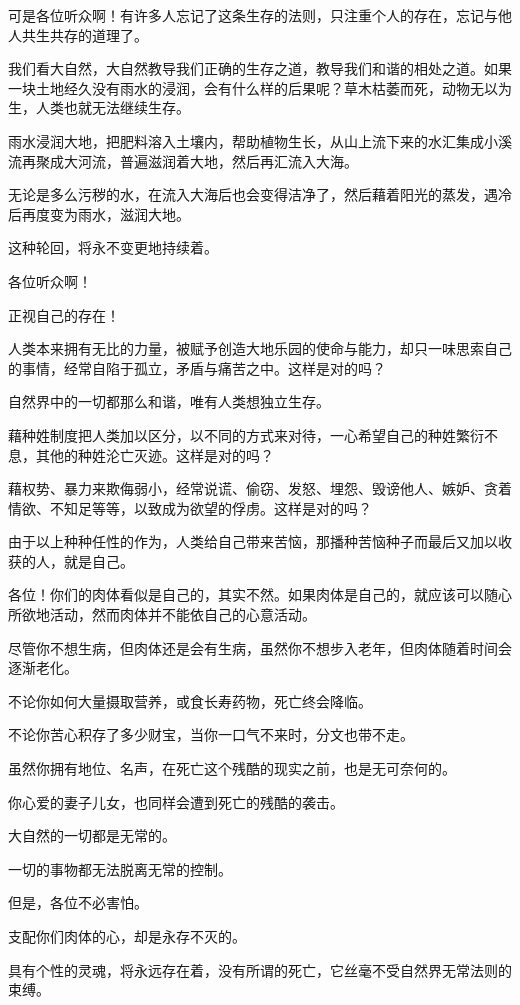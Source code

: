 \documentclass[twoside,openany]{book}
\begin{document}
可是各位听众啊！有许多人忘记了这条生存的法则，只注重个人的存在，忘记与他人共生共存的道理了。

我们看大自然，大自然教导我们正确的生存之道，教导我们和谐的相处之道。如果一块土地经久没有雨水的浸润，会有什么样的后果呢？草木枯萎而死，动物无以为生，人类也就无法继续生存。

雨水浸润大地，把肥料溶入土壤内，帮助植物生长，从山上流下来的水汇集成小溪流再聚成大河流，普遍滋润着大地，然后再汇流入大海。

无论是多么污秽的水，在流入大海后也会变得洁净了，然后藉着阳光的蒸发，遇冷后再度变为雨水，滋润大地。

这种轮回，将永不变更地持续着。

各位听众啊！

正视自己的存在！

人类本来拥有无比的力量，被赋予创造大地乐园的使命与能力，却只一味思索自己的事情，经常自陷于孤立，矛盾与痛苦之中。这样是对的吗？

自然界中的一切都那么和谐，唯有人类想独立生存。

藉种姓制度把人类加以区分，以不同的方式来对待，一心希望自己的种姓繁衍不息，其他的种姓沦亡灭迹。这样是对的吗？

藉权势、暴力来欺侮弱小，经常说谎、偷窃、发怒、埋怨、毁谤他人、嫉妒、贪着情欲、不知足等等，以致成为欲望的俘虏。这样是对的吗？

由于以上种种任性的作为，人类给自己带来苦恼，那播种苦恼种子而最后又加以收获的人，就是自己。

各位！你们的肉体看似是自己的，其实不然。如果肉体是自己的，就应该可以随心所欲地活动，然而肉体并不能依自己的心意活动。

尽管你不想生病，但肉体还是会有生病，虽然你不想步入老年，但肉体随着时间会逐渐老化。

不论你如何大量摄取营养，或食长寿药物，死亡终会降临。

不论你苦心积存了多少财宝，当你一口气不来时，分文也带不走。

虽然你拥有地位、名声，在死亡这个残酷的现实之前，也是无可奈何的。

你心爱的妻子儿女，也同样会遭到死亡的残酷的袭击。

大自然的一切都是无常的。

一切的事物都无法脱离无常的控制。

但是，各位不必害怕。

支配你们肉体的心，却是永存不灭的。

具有个性的灵魂，将永远存在着，没有所谓的死亡，它丝毫不受自然界无常法则的束缚。
\end{document}

